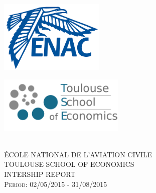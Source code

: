 \documentclass[titlepage, 11pt]{article}
\begin{document}
\begin{titlepage}

\newcommand{\HRule}{\rule{\linewidth}{0.5mm}} %

\center %
\begin{minipage}{0.4\textwidth}
\begin{flushleft} 
\includegraphics[width=50mm,scale=0.3]{ENAC.png}\\[1cm] %
\end{flushleft}
\end{minipage}
\begin{minipage}{0.4\textwidth}
\begin{flushright}
 \includegraphics[width=60mm,scale=0.6]{TSE.png}\\[1cm]
 \end{flushright}
\end{minipage}\\[1.5cm]


\textsc{\LARGE ÉCOLE NATIONAL DE L'AVIATION CIVILE }\\[1cm] %
\textsc{\LARGE TOULOUSE SCHOOL OF ECONOMICS }\\[1.5cm]
\textsc{\Large INTERSHIP REPORT}\\[1 cm] %
\textsc{\large Period: 02/05/2015 - 31/08/2015}\\[1.5cm] %


\end{titlepage}
\end{document}
